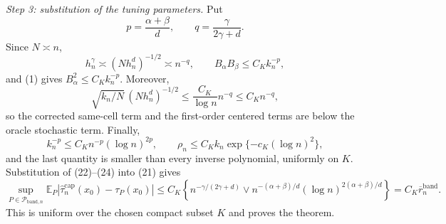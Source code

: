 \emph{Step 3: substitution of the tuning parameters.}
Put
\[
p=\frac{\alpha+\beta}{d},\qquad
q=\frac{\gamma}{2\gamma+d}.
\]
Since \(N\asymp n\),
\[
h_n^\gamma\asymp(Nh_n^d)^{-1/2}\asymp n^{-q},
\qquad
B_\alpha B_\beta\le C_Kk_n^{-p},
\tag{22}
\]
and (1) gives \(B_\alpha^2\le C_Kk_n^{-p}\).  Moreover,
\[
\sqrt{k_n/N}\,(Nh_n^d)^{-1/2}
\le \frac{C_K}{\log n}n^{-q}\le C_Kn^{-q},
\tag{23}
\]
so the corrected same-cell term and the first-order centered terms are below
the oracle stochastic term.  Finally,
\[
k_n^{-p}\le C_Kn^{-p}(\log n)^{2p},
\qquad
\rho_n\le C_Kk_n\exp\{-c_K(\log n)^2\},
\tag{24}
\]
and the last quantity is smaller than every inverse polynomial, uniformly on
\(K\).  Substitution of (22)--(24) into (21) gives
\[
\sup_{P\in\mathcal P_{\mathrm{band},n}}
\mathbb E_P\left|
\widehat\tau_n^{\mathrm{cap}}(x_0)-\tau_P(x_0)
\right|
\le C_K\left\{n^{-\gamma/(2\gamma+d)}
\vee n^{-(\alpha+\beta)/d}
(\log n)^{2(\alpha+\beta)/d}\right\}
=C_K\overline r_n^{\mathrm{band}}.
\]
This is uniform over the chosen compact subset \(K\) and proves the theorem.
